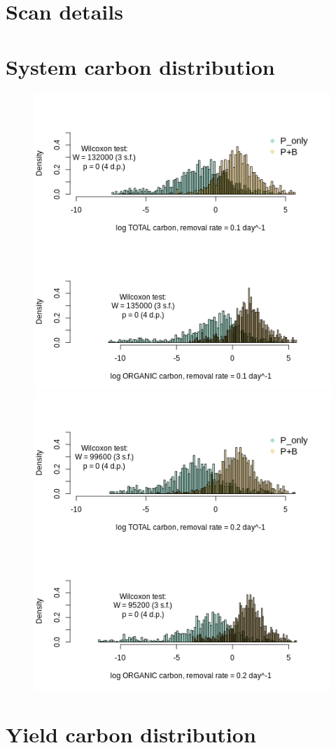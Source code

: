 \documentclass[a4paper]{article}
\begin{document}
\section{Scan details}


\section{System carbon distribution}
\begin{figure}[H]
    \includegraphics[width=.5\linewidth]{result/sys_01.png}
    \includegraphics[width=.5\linewidth]{result/sys_02.png}
\end{figure}

\section{Yield carbon distribution}
\end{document}

